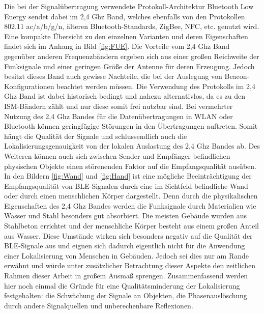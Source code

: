 Die bei der Signalübertragung verwendete Protokoll-Architektur Bluetooth Low Energy sendet dabei im 2,4 Ghz Band, welches ebenfalls von den Protokollen 802.11 ac/a/b/g/n, älteren Bluetooth-Standards, ZigBee, NFC, etc. genutzt wird. Eine kompakte Übersicht zu den einzelnen Varianten und deren Eigenschaften findet sich im Anhang in Bild \ref{fig:FUE}. Die Vorteile vom 2,4 Ghz Band gegenüber anderen Frequenzbändern ergeben sich aus einer großen Reichweite der Funksignale und einer geringen Größe der Antenne für deren Erzeugung. Jedoch besitzt dieses Band auch gewisse Nachteile, die bei der Auslegung von Beacon-Konfigurationen beachtet werden müssen. Die Verwendung des Protokolls im 2,4 Ghz Band ist dabei historisch bedingt und nahezu alternativlos, da es zu den ISM-Bändern \cite{BuNet} zählt und nur diese somit frei nutzbar sind. Bei vermehrter Nutzung des 2,4 Ghz Bandes für die Datenübertragungen in WLAN oder Bluetooth können geringfügige Störungen in den Übertragungen auftreten. Somit hängt die Qualität der Signale und schlussendlich auch die Lokalisierungsgenauigkeit von der lokalen Auslastung des 2,4 Ghz Bandes ab. Des Weiteren können auch sich zwischen Sender und Empfänger befindlichen physischen Objekte einen störenenden Faktor auf die Empfangsqualität ausüben. In den Bildern \ref{fig:Wand} und \ref{fig:Hand} ist eine mögliche Beeinträchtigung der Empfangsqualität von BLE-Signalen durch eine im Sichtfeld befindliche Wand oder durch einen menschlichen Körper dargestellt. Denn durch die physikalischen Eigenschaften des 2,4 Ghz Bandes werden die Funksignale durch Materialien wie Wasser und Stahl besonders gut absorbiert. Die meisten Gebäude wurden aus Stahlbeton errichtet und der menschliche Körper besteht aus einem großen Anteil aus Wasser. Diese Umstände wirken sich besonders negativ auf die Qualität der BLE-Signale aus und eignen sich dadurch eigentlich nicht für die Anwendung einer Lokalisierung von Menschen in Gebäuden. Jedoch sei dies nur am Rande erwähnt und würde unter zusätzlicher Betrachtung dieser Aspekte den zeitlichen Rahmen dieser Arbeit in großem Ausmaß sprengen. Zusammenfassend werden hier noch einmal die Gründe für eine Qualitätsminderung der Lokalisierung festgehalten: die Schwächung der Signale an Objekten, die Phasenauslöschung durch andere Signalquellen und unberechenbare Reflexionen.\\ \\
